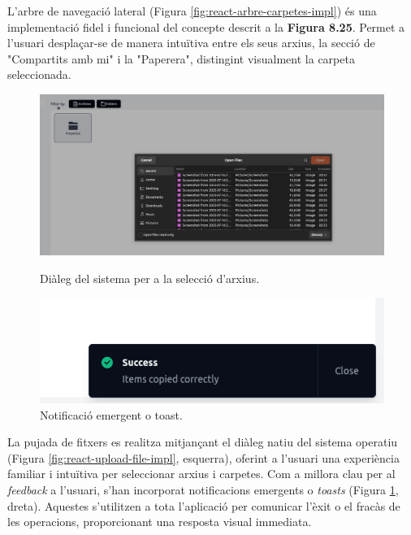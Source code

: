 L'arbre de navegació lateral (Figura \ref{fig:react-arbre-carpetes-impl}) és una implementació fidel i funcional del concepte descrit a la \textbf{Figura 8.25}. Permet a l'usuari desplaçar-se de manera intuïtiva entre els seus arxius, la secció de "Compartits amb mi" i la "Paperera", distingint visualment la carpeta seleccionada.

\begin{figure}[H]
    \centering
    \begin{minipage}{0.48\textwidth}
        \centering
        \includegraphics[width=\linewidth]{Figures/ui-web/upload_file.png}
        \caption{Diàleg del sistema per a la selecció d'arxius.}
        \label{fig:react-upload-file-impl}
    \end{minipage}\hfill
    \begin{minipage}{0.48\textwidth}
        \centering
        \includegraphics[width=\linewidth]{Figures/ui-web/notification.png}
        \caption{Notificació emergent o toast.}
        \label{fig:react-notification-impl}
    \end{minipage}
\end{figure}

La pujada de fitxers es realitza mitjançant el diàleg natiu del sistema operatiu (Figura \ref{fig:react-upload-file-impl}, esquerra), oferint a l'usuari una experiència familiar i intuïtiva per seleccionar arxius i carpetes. Com a millora clau per al \textit{feedback} a l'usuari, s'han incorporat notificacions emergents o \textit{toasts} (Figura \ref{fig:react-notification-impl}, dreta). Aquestes s'utilitzen a tota l'aplicació per comunicar l'èxit o el fracàs de les operacions, proporcionant una resposta visual immediata.

